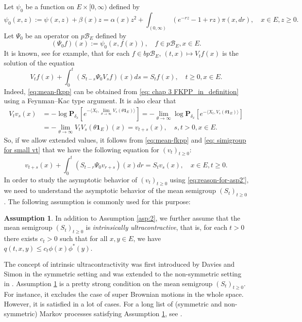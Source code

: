 \documentclass[UTF8]{pkuthss}
\theoremstyle{plain}
\theoremstyle{definition}
\newtheorem{asp}{Assumption}[chapter]
\numberwithin{equation}{section}
\begin{document}
	Let $\psi_0$ be a function on $E\times[0,\infty)$ defined by
\[
	\psi_0(x,z)
	:= \psi(x,z) + \beta(x)z
	= \alpha(x)z^2 + \int_{(0,\infty)}(e^{-rz}-1+rz) \pi(x,dr),
	\quad x\in E, z\geq 0.
\] 
	Let $\Psi_0$ be an operator on $p\mathscr B_E$ defined by
\[
	(\Psi_0 f)(x)
	:= \psi_0(x,f(x)),
	\quad f\in p\mathscr B_E, x\in E.
\]
	It is known, see \cite[Theorem 2.23]{Li2011MeasureValued} for example, that for each $f\in bp\mathscr B_E$, $(t,x) \mapsto V_tf(x)$ is the solution of the equation
\begin{equation}
\label{eq:mean-fkpp}
	V_t f(x) + \int_0^t (S_{t-s}\Psi_0 V_s f)(x) ds
	= S_t f(x),\quad t\geq 0, x\in E.
\end{equation}
	Indeed, \eqref{eq:mean-fkpp} can be obtained from \eqref{eq: chap 3 FKPP_in_definition} using a Feynman–Kac type  argument.
	It is also clear that
\begin{align}\label{eq: simigroup for small vt}
	V_t v_s(x)
	&= -\log \mathbf P_{\delta_x}[e^{-\langle X_t,\lim_{\theta\to\infty } V_s(\theta \mathbf 1_E)\rangle}]
	= -\lim_{\theta \to \infty} \log \mathbf P_{\delta_x}[e^{-\langle X_t, V_s(\theta \mathbf 1_E)\rangle}]\\
	&= - \lim_{\theta\to\infty} V_t V_s(\theta \mathbf 1_E)(x)
	= v_{t+s}(x),
	\quad s,t>0, x\in E.
\end{align}
	So, if we allow extended values, it follows from  \eqref{eq:mean-fkpp} and \eqref{eq: simigroup for small vt} that we have the following equation for $(v_t)_{t\geq 0}$:
\begin{equation}\label{eq:reason-for-asp2'}
	v_{t+s}(x) + \int_0^t  (S_{t-r} \Psi_0 v_{r+s})(x)  dr
	= S_tv_s(x),
	\quad x\in E,t\geq 0.
\end{equation}
	 In order to study the asymptotic behavior of $(v_t)_{t\geq 0}$ using \eqref{eq:reason-for-asp2'},
	we need to understand the asymptotic behavior of the mean semigroup $(S_t)_{t\geq 0}$. The following assumption is commonly used for this purpose:
\begin{asp}
\label{asp:2'}
	In addition to Assumption \ref{asp:2}, we further assume that the mean semigroup $(S_t)_{t\geq 0}$ is \emph{intrinsically ultracontractive},
	that is, for each $t>0$ there exists $c_t>0$ such that for all $x,y\in E$, we have $q(t,x,y)\leq c_t\phi(x)\phi^*(y)$.
\end{asp}
	

		The concept of intrinsic ultracontractivity was first introduced by Davies and Simon \cite{DaviesSimon1984Ultracontractivity} in the symmetric setting and was extended to the non-symmetric setting in \cite{KimSong2008Intrinsic}.  Assumption 	\ref{asp:2'} is a pretty strong condition on the mean semigroup $(S_t)_{t\geq 0}$. For instance, it excludes the case of super Brownian motions in the whole space. However, it is satisfied in a lot of cases.
	For a long list of (symmetric and non-symmetric) Markov processes satisfying Assumption \ref{asp:2'}, see \cite{RenSongZhang2015Limit}.
\end{document}
